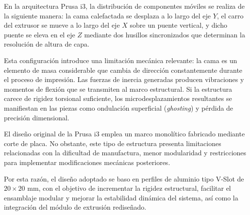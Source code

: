 En la arquitectura Prusa i3, la distribución de componentes móviles se realiza de la siguiente manera: la cama calefactada se desplaza a lo largo del eje $Y$, el carro del extrusor se mueve a lo largo del eje $X$ sobre un puente vertical, y dicho puente se eleva en el eje $Z$ mediante dos husillos sincronizados que determinan la resolución de altura de capa.

Esta configuración introduce una limitación mecánica relevante: la cama es un elemento de masa considerable que cambia de dirección constantemente durante el proceso de impresión. Las fuerzas de inercia generadas producen vibraciones y momentos de flexión que se transmiten al marco estructural. Si la estructura carece de rigidez torsional suficiente, los microdesplazamientos resultantes se manifiestan en las piezas como ondulación superficial (\textit{ghosting}) y pérdida de precisión dimensional.

El diseño original de la Prusa i3 emplea un marco monolítico fabricado mediante corte de placa. No obstante, este tipo de estructura presenta limitaciones relacionadas con la dificultad de manufactura, menor modularidad y restricciones para implementar modificaciones mecánicas posteriores. 

Por esta razón, el diseño adoptado se baso en perfiles de aluminio tipo V-Slot de $20 \times 20$ mm, con el objetivo de incrementar la rigidez estructural, facilitar el ensamblaje modular y mejorar la estabilidad dinámica del sistema, así como la integración del módulo de extrusión rediseñado.




